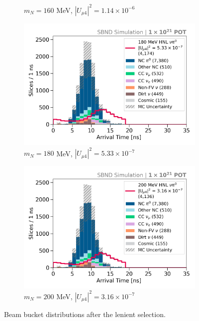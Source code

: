 \begin{figure}[hb!]
\begin{subfigure}[b]{0.495\textwidth}
            \caption{$m_N = 160$ MeV, $|U_{\mu4}|^2 = 1.14 \times 10^{-6}$ }
        \end{subfigure}
        \begin{subfigure}[b]{0.495\textwidth}
            \includegraphics[width=\textwidth]{m180}
            \caption{$m_N = 180$ MeV, $|U_{\mu4}|^2 = 5.33 \times 10^{-7}$ }
        \end{subfigure}
        \begin{subfigure}[b]{0.495\textwidth}
            \includegraphics[width=\textwidth]{m200}
            \caption{$m_N = 200$ MeV, $|U_{\mu4}|^2 = 3.16 \times 10^{-7}$ }
        \end{subfigure}
	\caption[Lenient Beam Bucket Distributions in the Mass Range 140 - 200 MeV]{
	Beam bucket distributions after the lenient selection.
	}
\end{figure}

